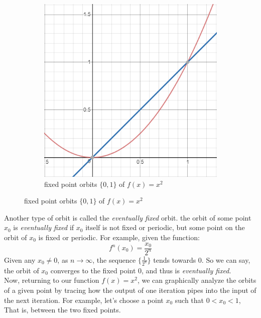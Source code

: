 \documentclass[20pt]{article} %
\begin{document}
\begin{figure}[!htbp]
  	\centering
   	\begin{subfigure}[p]{0.5\linewidth}
    	\includegraphics[width=\linewidth]{./figures/fp-1.png}
	\caption{fixed point orbits $\{0,1\}$ of $f(x)=x^{2}$}
   	\end{subfigure}
\end{figure} 

Another type of orbit is called the \textit{eventually fixed} orbit.  the orbit of some point $x_0$ is \textit{eventually fixed} if $x_0$ itself is not fixed or periodic, but some point on the orbit of $x_0$ is fixed or periodic.  For example, given the function: 
$$f^{n}(x_0)=\frac{x_0}{2^{n}}$$
Given any $x_0 \neq 0$, as $n \rightarrow \infty$, the sequence $\{ \frac{1}{2^{n}} \}$ tends towards 0.  So we can say, the orbit of $x_0$ converges to the fixed point 0, and thus is \textit{eventually fixed}. \\ 

Now, returning to our function $f(x)=x^{2}$, we can graphically analyze the orbits of a given point by tracing how the output of one iteration pipes into the input of the next iteration.  For example, let's choose a point $x_0$ such that $0 < x_0 < 1$, That is, between the two fixed points.  
\end{document}
